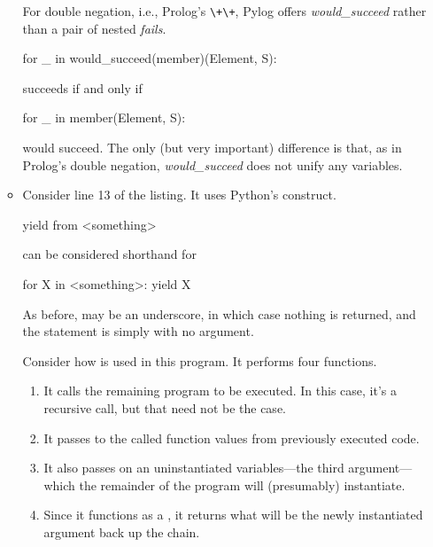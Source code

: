 \begin{sloppypar}
\begin{itemize}[label=$\bullet$]
\begin{itemize}[label=$\circ$]
For double negation, i.e., Prolog's \texttt{\textbackslash+\textbackslash+}, Pylog offers \textit{would\_succeed} rather than a pair of nested \textit{fails}.
\begin{python}
for _ in would_succeed(member)(Element, S):
\end{python} 
succeeds if and only if
\begin{python}
for _ in member(Element, S):
\end{python} 
would succeed. The only (but very important) difference is that, as in  Prolog's double negation, \textit{would\_succeed} does not unify any variables.
\smallv

\item Consider line 13 of the listing. It uses Python's  construct. 

\begin{python}
  yield from <something>
\end{python}
can be considered shorthand for 
\begin{python}
for X in <something>:
  yield X
\end{python}
As before,  may be an underscore, in which case nothing is returned, and the  statement is simply  with no argument.
% 
\smallv

Consider how   is used in this program. It performs four functions.
\begin{enumerate}
\item It calls the remaining program to be executed. In this case, it's a recursive call, but that need not be the case.
\item It passes to the called function values from previously executed code. 
\item It also passes on an uninstantiated variables---the third argument---which the remainder of the program will (presumably) instantiate.
\item Since it functions as a , it returns what will be the newly instantiated argument back up the   chain.
\end{enumerate}
\smallv


\end{itemize}
\end{itemize}
\end{sloppypar}
